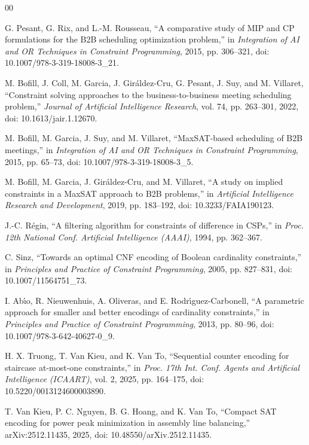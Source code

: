 \documentclass[conference,a4paper]{IEEEtran}
\begin{document}
\begin{thebibliography}{00}

G. Pesant, G. Rix, and L.-M. Rousseau,
``A comparative study of MIP and CP formulations for the B2B scheduling
optimization problem,'' in \emph{Integration of AI and OR Techniques in
Constraint Programming}, 2015, pp. 306--321,
doi: 10.1007/978-3-319-18008-3\_21.

M. Bofill, J. Coll, M. Garcia, J. Gir\'{a}ldez-Cru, G. Pesant, J. Suy, and
M. Villaret,
``Constraint solving approaches to the business-to-business meeting scheduling
problem,'' \emph{Journal of Artificial Intelligence Research}, vol. 74,
pp. 263--301, 2022, doi: 10.1613/jair.1.12670.

M. Bofill, M. Garcia, J. Suy, and M. Villaret,
``MaxSAT-based scheduling of B2B meetings,''
in \emph{Integration of AI and OR Techniques in Constraint Programming}, 2015,
pp. 65--73, doi: 10.1007/978-3-319-18008-3\_5.

M. Bofill, M. Garcia, J. Gir\'{a}ldez-Cru, and M. Villaret,
``A study on implied constraints in a MaxSAT approach to B2B problems,''
in \emph{Artificial Intelligence Research and Development}, 2019,
pp. 183--192, doi: 10.3233/FAIA190123.

J.-C. R\'{e}gin,
``A filtering algorithm for constraints of difference in CSPs,''
in \emph{Proc. 12th National Conf. Artificial Intelligence (AAAI)}, 1994,
pp. 362--367.

C. Sinz, ``Towards an optimal CNF encoding of Boolean cardinality constraints,''
in \emph{Principles and Practice of Constraint Programming}, 2005,
pp. 827--831, doi: 10.1007/11564751\_73.

I. Ab\'{\i}o, R. Nieuwenhuis, A. Oliveras, and E. Rodr\'{\i}guez-Carbonell,
``A parametric approach for smaller and better encodings of cardinality
constraints,'' in \emph{Principles and Practice of Constraint Programming},
2013, pp. 80--96, doi: 10.1007/978-3-642-40627-0\_9.

H. X. Truong, T. Van Kieu, and K. Van To,
``Sequential counter encoding for staircase at-most-one constraints,''
in \emph{Proc. 17th Int. Conf. Agents and Artificial Intelligence (ICAART)},
vol. 2, 2025, pp. 164--175, doi: 10.5220/0013124600003890.

T. Van Kieu, P. C. Nguyen, B. G. Hoang, and K. Van To,
``Compact SAT encoding for power peak minimization in assembly line
balancing,''
arXiv:2512.11435, 2025,
doi: 10.48550/arXiv.2512.11435.


\end{thebibliography}
\end{document}
